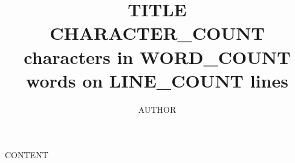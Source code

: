 \documentclass[8pt, twocolumn]{article}
\title{TITLE \\ \vspace{6pt} \small{CHARACTER_COUNT characters in WORD_COUNT words on LINE_COUNT lines}}
\author{AUTHOR}
\begin{document}
	\maketitle

	CONTENT
\end{document}
